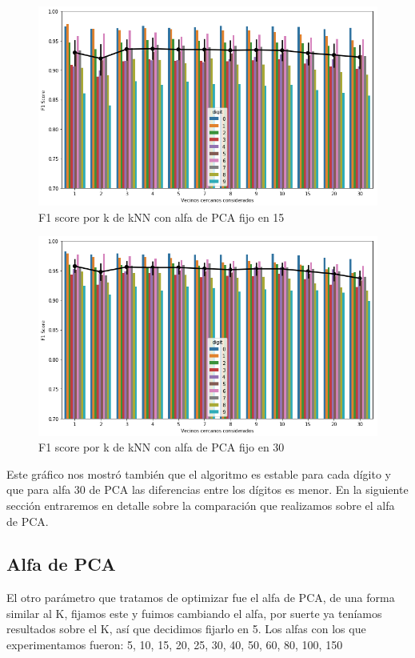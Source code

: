 \begin{figure}[H]
    \begin{center}
      \includegraphics[width=0.8\columnwidth]{imagenes/F1_alpha_15.png}
      \caption{F1 score por k de kNN con alfa de PCA fijo en 15}
    \end{center}
\end{figure}

\begin{figure}[H]
    \begin{center}
      \includegraphics[width=0.8\columnwidth]{imagenes/F1_alpha_30.png}
      \caption{F1 score por k de kNN con alfa de PCA fijo en 30}
    \end{center}
\end{figure}

Este gráfico nos mostró también que el algoritmo es estable para cada dígito y que para alfa 30 de PCA las diferencias entre los dígitos es menor. En la siguiente sección entraremos en detalle sobre la comparación que realizamos sobre el alfa de PCA.

\subsection{Alfa de PCA}

El otro parámetro que tratamos de optimizar fue el alfa de PCA, de una forma similar al K, fijamos este y fuimos cambiando el alfa, por suerte ya teníamos resultados sobre el K, así que decidimos fijarlo en 5. Los alfas con los que experimentamos fueron: 5, 10, 15, 20, 25, 30, 40, 50, 60, 80, 100, 150

